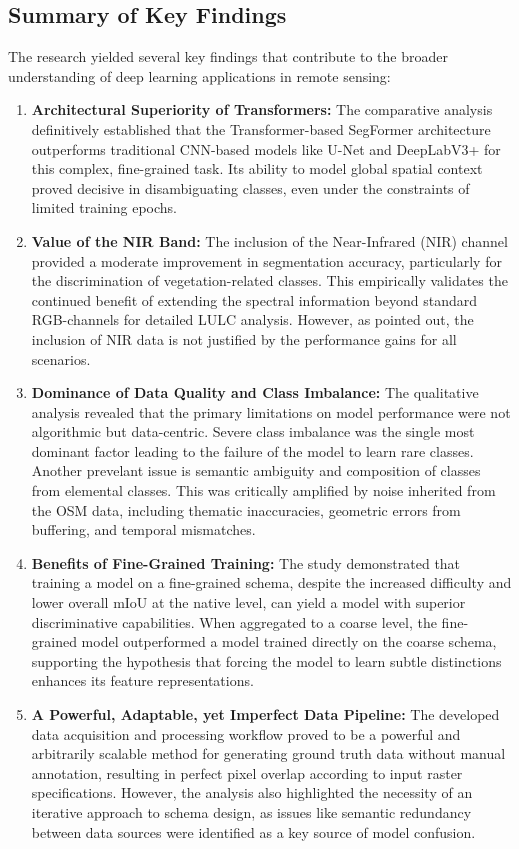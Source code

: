 \documentclass{report}
\begin{document}
\subsection{Summary of Key Findings}
The research yielded several key findings that contribute to the broader understanding of deep learning applications in remote sensing:
\begin{enumerate}
    \item \textbf{Architectural Superiority of Transformers:} The comparative analysis definitively established that the Transformer-based SegFormer architecture outperforms traditional CNN-based models like U-Net and DeepLabV3+ for this complex, fine-grained task. Its ability to model global spatial context proved decisive in disambiguating classes, even under the constraints of limited training epochs.
    \item \textbf{Value of the NIR Band:} The inclusion of the Near-Infrared (NIR) channel provided a moderate improvement in segmentation accuracy, particularly for the discrimination of vegetation-related classes. This empirically validates the continued benefit of extending the spectral information beyond standard RGB-channels for detailed LULC analysis. However, as pointed out, the inclusion of NIR data is not justified by the performance gains for all scenarios.
    
    \item \textbf{Dominance of Data Quality and Class Imbalance:} The qualitative analysis revealed that the primary limitations on model performance were not algorithmic but data-centric. Severe class imbalance was the single most dominant factor leading to the failure of the model to learn rare classes. Another prevelant issue is semantic ambiguity and composition of classes from elemental classes. This was critically amplified by noise inherited from the OSM data, including thematic inaccuracies, geometric errors from buffering, and temporal mismatches.
    \item \textbf{Benefits of Fine-Grained Training:} The study demonstrated that training a model on a fine-grained schema, despite the increased difficulty and lower overall mIoU at the native level, can yield a model with superior discriminative capabilities. When aggregated to a coarse level, the fine-grained model outperformed a model trained directly on the coarse schema, supporting the hypothesis that forcing the model to learn subtle distinctions enhances its feature representations.
    \item \textbf{A Powerful, Adaptable, yet Imperfect Data Pipeline:} The developed data acquisition and processing workflow proved to be a powerful and arbitrarily scalable method for generating ground truth data without manual annotation, resulting in perfect pixel overlap according to input raster specifications. However, the analysis also highlighted the necessity of an iterative approach to schema design, as issues like semantic redundancy between data sources were identified as a key source of model confusion.
\end{enumerate}
\end{document}

